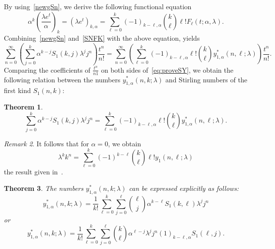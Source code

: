 \documentclass{amsart}
\newtheorem{theorem}{Theorem}[section]
\numberwithin{equation}{section}
\theoremstyle{definition}
\theoremstyle{remark}
\newtheorem{remark}[theorem]{Remark}
\begin{document}
By using~\eqref{newgSn}, we derive the following functional equation
\begin{equation}
\alpha^k\left(\frac{\lambda e^t}{\alpha}\right)_{k}=(\lambda e^t)_{k, \alpha}=\sum_{\ell=0}^{k}(-1)_{k-\ell,\alpha}\binom{k}{\ell}\ell! F_{\ell}(t;\alpha,\lambda).
\end{equation}
Combining~\eqref{newgSn} and~\eqref{SNFK} with the above equation, yields
\begin{equation}\label{eq:proveSY}
\sum_{n=0}^{\infty}\left(\sum_{j=0}^{k}\alpha^{k-j}S_{1}(k,j)\lambda^{j}j^n\right)\frac{t^n}{n!}=\sum_{n=0}^{\infty}\left(\sum_{\ell=0}^{k}(-1)_{k-\ell, \alpha}\ell!\binom{k}{\ell}y_{1,\alpha}^{*}(n,\ell;\lambda)\right)\frac{t^n}{n!}. 
\end{equation}
Comparing the coefficients of $\frac{t^n}{n1}$ on both sides of~\eqref{eq:proveSY}, we obtain the
following relation between the numbers $y_{1,\alpha}^{*}(n,k;\lambda)$ and Stirling numbers of the first kind $S_{1}(n, k)$:
\begin{theorem}
\begin{equation}
    \sum_{j=0}^{k}\alpha^{k-j}S_{1}(k,j)\lambda^jj^n=\sum_{\ell=0}^{k}(-1)_{k-\ell, \alpha}\ell!\binom{k}{\ell}y_{1,\alpha}^{*}(n,\ell;\lambda).
\end{equation}
\end{theorem}
\begin{remark}
It follows that for $\alpha=0$, we obtain 
\begin{equation*}
  \lambda^{k}k^n=\sum_{\ell=0}^{k}(-1)^{k-\ell}\binom{k}{\ell}\ell!y_{1}(n,\ell;\lambda)
\end{equation*}
the result given in~\cite{YS1018}.
\end{remark}
\begin{theorem}\label{thm:formntdSn}
The numbers $y_{1, \alpha}^{*}(n,k;\lambda)$ can be expressed explicitly  as follows:
 \begin{equation}\label{expforntsn}
 y_{1,\alpha}^{*}(n,k;\lambda)=\frac{1}{k!}\sum_{\ell=0}^{k}\sum_{j=0}^{\ell}\binom{\ell}{j}\alpha^{k-\ell}S_{1}(k,\ell)\lambda^{j}j^{n}
    \end{equation}
or
\begin{equation}\label{expforntsn2}
y_{1, \alpha}^{*}(n,k;\lambda)=\frac{1}{k!}\sum_{\ell=0}^{k}\sum_{j=0}^{\ell}\binom{k}{\ell}\alpha^{\ell-j}\lambda^{j}j^{n}(1)_{k-\ell, \alpha}S_{1}(\ell,j).
\end{equation}
\end{theorem}
\end{document}
